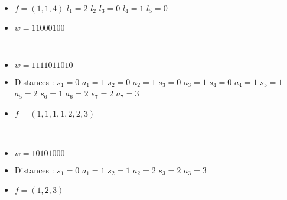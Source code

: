 \begin{example}[$a < b : a = 3, b = 5,
    \mathcal{PF'}_{a,b} \to \mathcal{R}_{a,b}$]
    ~\
    \begin{itemize}
        \item $f = (1, 1, 4)$
            \subitem $l_1 = 2$
            \hspace{2cm} $l_2$
            \hspace{2cm} $l_3 = 0$
            \subitem $l_4 = 1$
            \hspace{2cm} $l_5 = 0$
        \item $w = 11000100$
    \end{itemize}
    
\end{example}

\begin{example}[$a > b : a = 7, b = 3,
    \mathcal{R}_{a,b} \to \mathcal{PF'}_{a,b}$]
    ~\
    \begin{itemize}
        \item $w = 1111011010$
    \end{itemize}
    
    \begin{itemize}
        \item Distances : 
            \subitem $s_1 = 0$
                \hspace{2cm} $a_1 = 1$
            \subitem $s_2 = 0$
                \hspace{2cm} $a_2 = 1$
            \subitem $s_3 = 0$
                \hspace{2cm} $a_3 = 1$
            \subitem $s_4 = 0$
                \hspace{2cm} $a_4 = 1$
            \subitem $s_5 = 1$
                \hspace{2cm} $a_5 = 2$
            \subitem $s_6 = 1$
                \hspace{2cm} $a_6 = 2$
            \subitem $s_7 = 2$
                \hspace{2cm} $a_7 = 3$
        \item $f = (1, 1, 1, 1, 2, 2, 3)$
    \end{itemize}
    
\end{example}

\begin{example}[$a < b : a = 3, b = 5,
    \mathcal{R}_{a,b} \to \mathcal{PF'}_{a,b}$]
    ~\
    \begin{itemize}
        \item $w = 10101000$
    \end{itemize}
    
    \begin{itemize}
        \item Distances : 
            \subitem $s_1 = 0$
                \hspace{2cm} $a_1 = 1$
            \subitem $s_2 = 1$
                \hspace{2cm} $a_2 = 2$
            \subitem $s_3 = 2$
                \hspace{2cm} $a_3 = 3$
        \item $f = (1, 2, 3)$
    \end{itemize}
    
\end{example}

